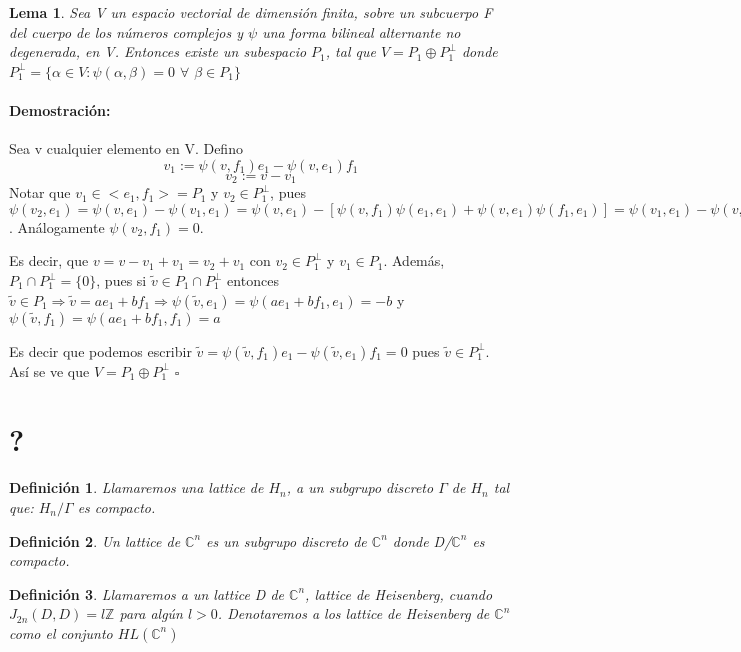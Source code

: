 \documentclass[12pt]{article}
\newtheorem{lemma}{Lema}
\newtheorem{definition}{Definición}
\newenvironment{proof}{\paragraph{Demostración:}}{\hfill$\square$}
\begin{document}
\begin{lemma}
 Sea V un espacio vectorial de dimensión finita, sobre un subcuerpo F del cuerpo de los números complejos y
 $\psi$ una forma bilineal alternante no degenerada, en V.
 Entonces existe un subespacio $P_1$, tal que \newline
 $V = P_1 \oplus P_1^{\bot}$
 donde $P_1^{\bot}= \{ \alpha \in V: \psi(\alpha,\beta)=0$  $\forall$  $\beta \in P_1 \} $
 \end{lemma}
 
 \begin{proof}
 Sea v cualquier elemento en V.
 Defino 
 $$v_1:=\psi(v,f_1)e_1-\psi(v,e_1)f_1$$
 $$v_2:=v-v_1$$
 Notar que $v_1 \in <e_1,f_1>=P_1$ y $v_2 \in P_1^{\bot}$, pues 
 $\psi(v_2,e_1)=\psi(v,e_1)-\psi(v_1,e_1)=\psi (v,e_1)-[\psi(v,f_1) \psi(e_1,e_1) + \psi(v,e_1) \psi(f_1,e_1)]=
 \psi(v_1,e_1)- \psi(v,e_1)=0$.\newline
 Análogamente $\psi(v_2,f_1)=0$.
 
 Es decir, que $v=v-v_1+v_1=v_2 + v_1$ con $v_2 \in P_1^{\bot}$ y $v_1 \in P_1$.\newline
 Además, $P_1  \cap P_1^{\bot} = \{0\}$, pues si  $\tilde{v} \in  P_1 \cap P_1^{\bot}$ entonces
 $\tilde{v} \in P_1 \Rightarrow \tilde{v}=a e_1 + b f_1 \Rightarrow 
 \psi(\tilde{v},e_1)=\psi(a e_1 + b f_1,e_1)=-b$ y $\psi(\tilde{v},f_1)=\psi(a e_1 + b f_1,f_1)=a $
 
 Es decir que podemos escribir $\tilde{v}=\psi(\tilde{v},f_1) e_1 - \psi(\tilde{v},e_1) f_1=0$ pues 
 $\tilde{v} \in P_1^{\bot}.$
 Así se ve que $V = P_1 \oplus P_1^{\bot}$ 
\end{proof} 



\section{?}

\begin{definition}
 Llamaremos una lattice de $H_n$, a un subgrupo discreto $\Gamma$ de $H_n$ tal que:
 $H_n/\Gamma$ es compacto.
\end{definition}

\begin{definition}
 Un lattice de $\mathbb{C}^n$ es un subgrupo discreto de $\mathbb{C}^n$ donde D/$\mathbb{C}^n$ es compacto.
\end{definition}


\begin{definition}
 Llamaremos a un lattice D de $\mathbb{C}^n$, lattice de Heisenberg, cuando $J_{2n}(D,D)=l \mathbb{Z} $ para algún $l > 0$.
 Denotaremos a los lattice de Heisenberg de $\mathbb{C}^n$ como el conjunto $HL(\mathbb{C}^n)$
\end{definition}
\end{document}
